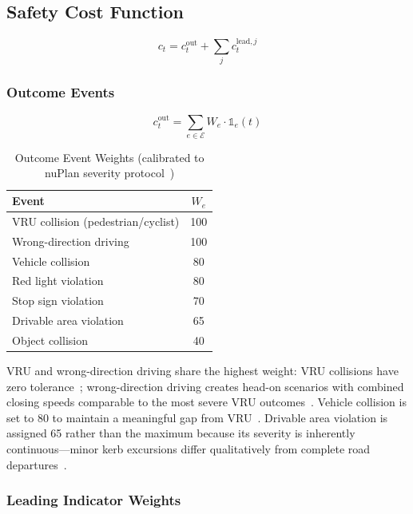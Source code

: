 \documentclass[conference]{IEEEtran}
\begin{document}
\subsection{Safety Cost Function}\label{sec:safety}

\begin{equation}
c_{t}=c_{t}^{\text{out}}+\sum_{j}c_{t}^{\text{lead},j}
\label{eq:cost}
\end{equation}

\subsubsection{Outcome Events}

\begin{equation}
c_{t}^{\text{out}}=\sum_{e\in\mathcal{E}}W_{e}\cdot\mathbb{1}_{e}(t)
\end{equation}

\begin{table}[h]
\centering
\caption{Outcome Event Weights (calibrated to nuPlan severity
protocol~\cite{nuPlan2024})}
\begin{tabular}{lc}
\toprule
Event & $W_{e}$\\
\midrule
VRU collision (pedestrian/cyclist)    & 100\\
Wrong-direction driving               & 100\\
Vehicle collision                     & 80\\
Red light violation                   & 80\\
Stop sign violation                   & 70\\
Drivable area violation               & 65\\
Object collision                      & 40\\
\bottomrule
\end{tabular}
\label{tab:weights}
\end{table}

VRU and wrong-direction driving share the highest weight: VRU collisions
have zero tolerance~\cite{nuPlan2024}; wrong-direction driving creates
head-on scenarios with combined closing speeds comparable to the most
severe VRU outcomes~\cite{AV_Collision2022}. Vehicle collision is set to
80 to maintain a meaningful gap from VRU~\cite{AV_Liability2023}.
Drivable area violation is assigned 65 rather than the maximum because
its severity is inherently continuous---minor kerb excursions differ
qualitatively from complete road departures~\cite{nuPlan2024}.

\subsubsection{Leading Indicator Weights}
\end{document}
